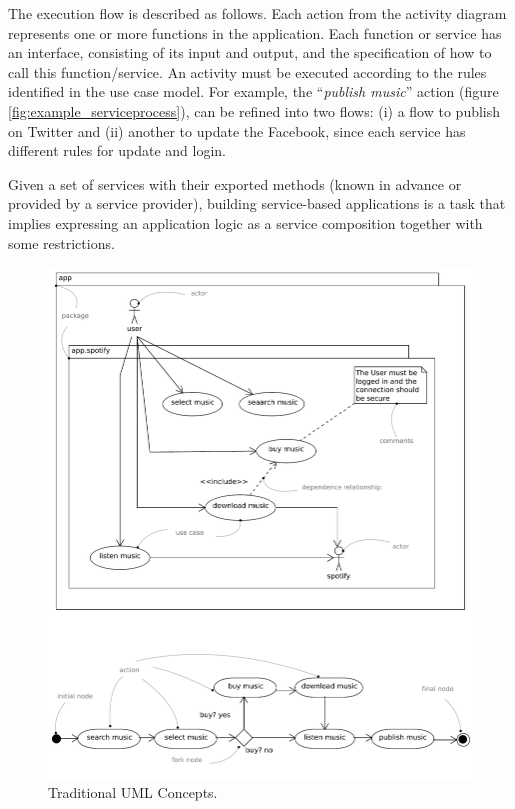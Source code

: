 The execution flow is described as follows. Each action from the activity
diagram represents one or more functions in the application. Each function or
service has an interface, consisting of its input and output, and the
specification of how to call this function/service. An activity must
be executed according to the rules identified in the use case model. For example, the
``\textit{publish music}'' action (figure \ref{fig:example_serviceprocess}),
can be refined into two flows: (i) a flow to publish on Twitter and (ii) another to
update the Facebook, since each service has different rules for update and
login.

Given a set of services with their exported methods (known
in advance or provided by a service provider), building service-based
applications is a task that implies expressing an application logic as a service
composition together with some restrictions. 



\begin{figure}[ht!] 
\centering
\includegraphics[width=.95\textwidth]{chapters/methodology/figs/runningExampleUCSingle_detail.pdf}
\caption{Traditional UML Concepts.}
\label{fig:umlConcepts} 
\end{figure}


